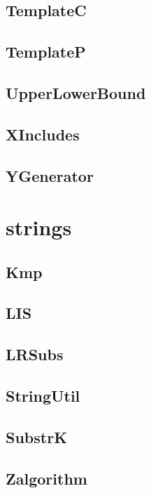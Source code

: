 \subsection{ TemplateC}
\raggedbottom
\hrulefill
\subsection{ TemplateP}
\raggedbottom
\hrulefill
\subsection{ UpperLowerBound}
\raggedbottom
\hrulefill
\subsection{ XIncludes}
\raggedbottom
\hrulefill
\subsection{ YGenerator}
\raggedbottom
\hrulefill

\section{strings}
\subsection{ Kmp}
\raggedbottom
\hrulefill
\subsection{ LIS}
\raggedbottom
\hrulefill
\subsection{ LRSubs}
\raggedbottom
\hrulefill
\subsection{ StringUtil}
\raggedbottom
\hrulefill
\subsection{ SubstrK}
\raggedbottom
\hrulefill
\subsection{ Zalgorithm}
\raggedbottom
\hrulefill

